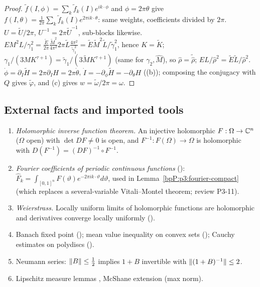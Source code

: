 \begin{proof}
\label{stepP:p3:pd-subst}
$\tilde f(I,\phi)=\sum_k\tilde f_k(I)e^{ik\cdot\phi}$ and $\phi=2\pi\theta$ give $f(I,\theta)=\frac1{2\pi}\sum_k\tilde f_k(I)e^{2\pi ik\cdot\theta}$: same weights, coefficients divided by $2\pi$. $U=\tilde U/2\pi$, $U^{-1}=2\pi\tilde U^{-1}$, sub-blocks likewise.
\label{stepP:p3:pd-invar}
$EM^2L/\gamma_1^2=\frac{\tilde E}{2\pi}\frac{\tilde M^2}{4\pi^2}2\pi\tilde L\frac{4\pi^2}{\tilde\gamma_1^2}=\tilde E\tilde M^2\tilde L/\tilde\gamma_1^2$, hence $K=\tilde K$;
$\gamma_1/(3MK^{\tau+1})=\tilde\gamma_1/(3\tilde MK^{\tau+1})$ (same for $\gamma_2,\hat M$), so $\hat\rho=\tilde{\hat\rho}$; $EL/\hat\rho^2=\tilde E\tilde L/\hat\rho^2$.
\label{stepP:p3:pd-dyn}
$\dot\phi=\partial_I\tilde H=2\pi\partial_IH=2\pi\dot\theta$, $\dot I=-\partial_\phi\tilde H=-\partial_\theta H$ ((b)); composing the conjugacy with $Q$ gives $\tilde\varphi$, and (c) gives $w=\tilde\omega/2\pi=\omega$.
\end{proof}

\subsection{External facts and imported tools}\label{bpP:p3:external}

\begin{enumerate}[label=(X\arabic*)]
\item\label{bpP:p3:ext-ift} \emph{Holomorphic inverse function theorem.} An injective holomorphic $F:\Omega\to\mathbb{C}^n$ ($\Omega$ open) with $\det DF\neq0$ is open, and $F^{-1}:F(\Omega)\to\Omega$ is holomorphic with $D(F^{-1})=(DF)^{-1}\circ F^{-1}$.
\item\label{bpP:p3:ext-fourier} \emph{Fourier coefficients of periodic continuous functions} (): $\hat F_k=\int_{[0,1]^n}F(\vartheta)e^{-2\pi ik\cdot\vartheta}d\vartheta$, used in Lemma~\ref{bpP:p3:fourier-compact} (which replaces a several-variable Vitali--Montel theorem; review P3-11).
\item\label{bpP:p3:ext-weierstrass} \emph{Weierstrass.} Locally uniform limits of holomorphic functions are holomorphic and derivatives converge locally uniformly ().
\item\label{bpP:p3:ext-banach} Banach fixed point (); mean value inequality on convex sets (); Cauchy estimates on polydiscs ().
\item\label{bpP:p3:ext-neumann} Neumann series: $\lVert B\rVert\le\frac12$ implies $1+B$ invertible with $\lVert (1+B)^{-1}\rVert\le2$.
\item\label{bpP:p3:ext-lip} Lipschitz measure lemmas , McShane extension  (max norm).
\end{enumerate}

